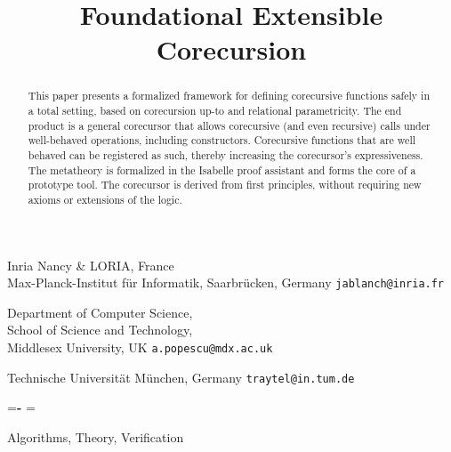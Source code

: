 \documentclass[preprint,draft]
{sigplanconf}
\newcommand{\<}{\langle}
\renewcommand{\>}{\rangle}
\begin{document}
\balancecolumns






\pagestyle{plain} 

\title{Foundational Extensible Corecursion}


{Inria Nancy \& LORIA, France \\ Max-Planck-Institut f\"ur Informatik, Saarbr\"ucken, Germany}
{\texttt{jablanch@inria.fr}}

{Department of Computer Science,  \\
School of Science and Technology, \\
Middlesex University, UK
}
{\texttt{a.popescu@mdx.ac.uk}}

{Technische Universit\"at M\"{u}nchen, Germany}
{\texttt{traytel@in.tum.de}}



\maketitle

\newcommand\XXX{\textbullet}
\newbox\boxHyph\setbox\boxHyph=\hbox{\textbf{-}}
\newbox\boxX\setbox\boxX=\hbox{\XXX}

\renewcommand\UrlFont{\tt}

\begin{abstract}
This paper presents a formalized framework for defining corecursive functions
safely in a total setting, based on corecursion up-to and
relational parametricity. The end product is a general corecursor that allows
corecursive (and even recursive) calls under well-behaved operations, including
constructors. Corecursive functions that are well behaved can be registered as
such, thereby increasing the corecursor's expressiveness.
The metatheory
is formalized in the Isabelle proof assistant and forms the core of a prototype
tool. The corecursor is derived from first
principles, without requiring new axioms or extensions of the logic.
\end{abstract}





\terms
Algorithms, Theory, Verification
\end{document}
